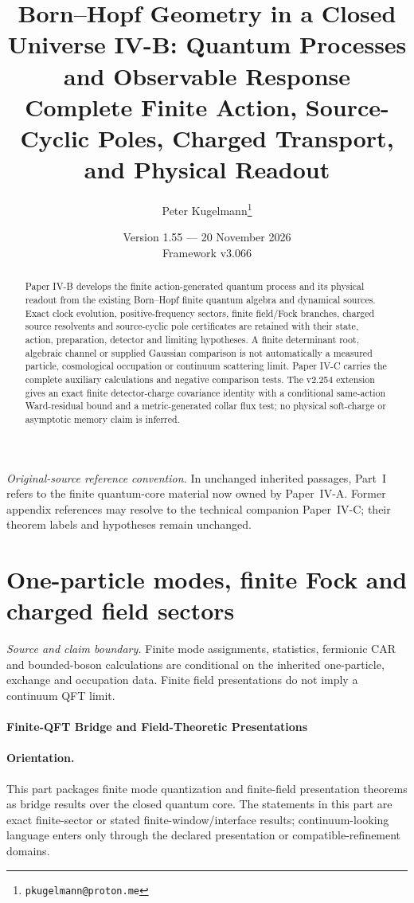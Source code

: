 \documentclass[12pt,a4paper]{article}
\title{\textbf{Born--Hopf Geometry in a Closed Universe IV-B: Quantum Processes and Observable Response} \\[0.5em]\large Complete Finite Action, Source-Cyclic Poles, Charged Transport, and Physical Readout}
\author{Peter Kugelmann\thanks{\texttt{pkugelmann@proton.me}}}
\date{Version 1.55 --- 20 November 2026 \\ Framework v3.066}
\begin{document}
\maketitle
\begin{abstract}
Paper IV-B develops the finite action-generated quantum process and its physical readout from the existing Born--Hopf finite quantum algebra and dynamical sources. Exact clock evolution, positive-frequency sectors, finite field/Fock branches, charged source resolvents and source-cyclic pole certificates are retained with their state, action, preparation, detector and limiting hypotheses. A finite determinant root, algebraic channel or supplied Gaussian comparison is not automatically a measured particle, cosmological occupation or continuum scattering limit. Paper IV-C carries the complete auxiliary calculations and negative comparison tests. The v2.254 extension gives an exact finite detector-charge covariance identity with a conditional same-action Ward-residual bound and a metric-generated collar flux test; no physical soft-charge or asymptotic memory claim is inferred.
\end{abstract}
\setcounter{tocdepth}{2}
\tableofcontents
\clearpage
\noindent\textit{Original-source reference convention.} In unchanged inherited passages, Part~I refers to the finite quantum-core material now owned by Paper~IV-A. Former appendix references may resolve to the technical companion Paper~IV-C; their theorem labels and hypotheses remain unchanged.

\section{One-particle modes, finite Fock and charged field sectors}
\label{p4b:sec:v238-b1}
\noindent\textit{Source and claim boundary.} Finite mode assignments, statistics, fermionic CAR and bounded-boson calculations are conditional on the inherited one-particle, exchange and occupation data. Finite field presentations do not imply a continuum QFT limit.

\paragraph{Finite-QFT Bridge and Field-Theoretic Presentations}
\label{p4:part:finite-qft-bridge}

\paragraph{Orientation.}
This part packages finite mode quantization and finite-field presentation theorems as bridge results over the closed quantum core.  The statements in this part are exact finite-sector or stated finite-window/interface results; continuum-looking language enters only through the declared presentation or compatible-refinement domains.
\end{document}
